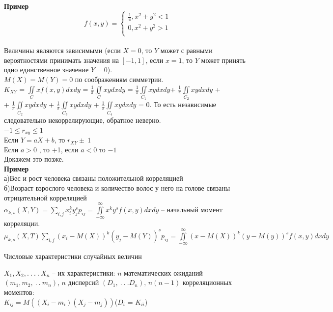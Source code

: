 \documentclass[russian, 12pt, fleqn]{article}
\begin{document}
\textbf{Пример}\\
\begin{equation*} 
f(x, y)=
 \begin{cases}
   \frac{1}{\pi},   x^2 + y^2 < 1\\
   0 , x^2 + y^2 > 1\\
 \end{cases}
\end{equation*}\\
Величины являются зависимыми (если $X  = 0$, то $Y$ может с равными вероятностями принимать значения на $[-1, 1]$, если $x=1$, то $Y$ может принять одно единственное значение $Y=0$).\\
$M(X)=M(Y) = 0$ по соображениям симметрии.\\
$K_{XY}$ = $\displaystyle{\iint\limits_{C}^{}} xf(x, y)dxdy$ =  $\frac{1}{\pi} \displaystyle{\iint\limits_{C}^{}} xy dxdy$ = $\frac{1}{\pi} \displaystyle{\iint\limits_{C_1}^{}} xy dxdy$+ $\frac{1}{\pi} \displaystyle{\iint\limits_{C_2}^{}} xy dxdy$ +\\+ $\frac{1}{\pi} \displaystyle{\iint\limits_{C_2}^{}} xy dxdy$ + $\frac{1}{\pi} \displaystyle{\iint\limits_{C_3}^{}} xy dxdy$ + $\frac{1}{\pi} \displaystyle{\iint\limits_{C_4}^{}} xy dxdy$ = $0$.
То есть независимые следовательно некоррелирующие, обратное неверно.\\
$-1\leq r_{xy} \leq 1$\\
Если $Y=aX+b$, то $r_{XY} \pm \ 1$\\
Если $a>0$   , то +1, если $a<0$ то $-1$\\
Докажем это позже.\\
\textbf{Пример}\\
а)Вес и рост человека связаны положительной корреляцией\\
б)Возраст взрослого человека и количество волос у него на голове связаны отрицательной корреляцией\\
$\alpha_{k,s} (X,Y) = \sum\limits_{i, j} x_i^k y_j^s p_{ij} =  \displaystyle{\iint\limits_{-\infty}^{\infty}} x^k y^s f(x, y) dx dy  $ -- начальный момент корреляции.\\ 
$\mu_{k,s}(X, T)  \sum\limits_{i, j} (x_i - M(X))^k (y_j - M(Y))^s p_{i j} = \displaystyle{\iint\limits_{-\infty}^{\infty}}(x-M(X))^k(y-M(y))^s f(x, y) dxdy$
\begin{center}
$\textbf{Числовые характеристики случайных величин}$
\end{center}
$X_1, X_2, .\ .\ .\ .\ X_n$ -- их характеристики: $n$ математических ожиданий $(m_1, m_2, \ .\ . \  m_n)$, $n$ дисперсий $(D_1, \ .\ .\ . D_n)$,  $n(n-1)$ корреляционных моментов:\\
$K_{ij} = M((X_i - m_i)(X_j - m_j))$($D_i$ = $K_{ii}$)\\
\end{document}
